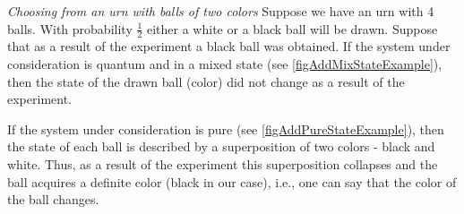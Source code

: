 \begin{example}
\emph{Choosing from an urn with balls of two colors}
Suppose we have an urn with 4 balls. With probability $\frac{1}{2}$
either a white or a black ball will be drawn. Suppose that as a result
of the experiment a black ball was obtained. If the system under consideration
is quantum and in a mixed state 
(see \autoref{figAddMixStateExample}), then the state
of the drawn ball (color) did not change as a result of the experiment. 




If the system under consideration is
pure (see \autoref{figAddPureStateExample}), then the state of each
ball is described by a superposition of two colors - black and white. Thus,
as a result of the experiment this superposition collapses and the ball
acquires a definite color (black in our case), i.e., one can say that the color
of the ball changes.
\end{example}